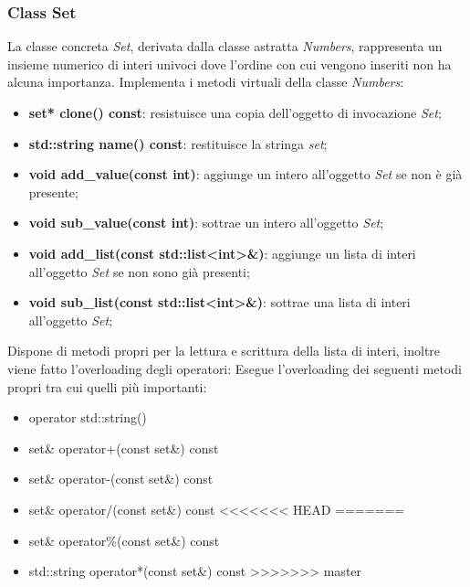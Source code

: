 \documentclass[a4paper,10pt]{article}
\begin{document}
    \subsubsection{Class Set}
    La classe concreta \textit{Set}, derivata dalla classe astratta \textit{Numbers}, rappresenta un insieme numerico di interi univoci dove l’ordine con cui vengono inseriti non ha alcuna importanza. 
    Implementa i metodi virtuali della classe \textit{Numbers}:
	\begin{itemize}
        \item \textbf{set* clone() const}: resistuisce una copia dell'oggetto di invocazione \textit{Set};
		\item \textbf{std::string name() const}: restituisce la stringa \textit{set};
        \item \textbf{void add\_value(const int)}: aggiunge un intero all'oggetto \textit{Set} se non è già presente;
		\item \textbf{void sub\_value(const int)}: sottrae un intero all'oggetto \textit{Set};
		\item \textbf{void add\_list(const std::list<int>\&)}: aggiunge un lista di interi all'oggetto \textit{Set} se non sono già presenti;
        \item \textbf{void sub\_list(const std::list<int>\&)}: sottrae una lista di interi all'oggetto \textit{Set};
    \end{itemize}
    Dispone di metodi propri per la lettura e scrittura della lista di interi, inoltre viene fatto l'overloading  degli operatori:
    Esegue l'overloading dei seguenti metodi propri tra cui  quelli più importanti:
    \begin{itemize}
        \item operator std::string()
        \item set\& operator+(const set\&) const
        \item set\& operator-(const set\&) const
        \item set\& operator/(const set\&) const
<<<<<<< HEAD
=======
        \item set\& operator\%(const set\&) const
        \item std::string operator*(const set\&) const
>>>>>>> master
    \end{itemize}
\end{document}

